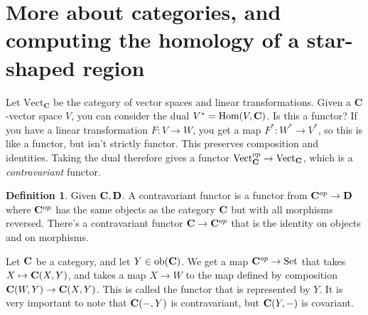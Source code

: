 \documentclass{amsart}
\theoremstyle{theorem}
\theoremstyle{definition}
\newtheorem{definition}[theorem]{Definition}
\DeclareMathOperator{\Hom}{Hom}
\newcommand{\set}{{\mathrm{Set}}}
\begin{document}
\section{More about categories, and computing the homology of a star-shaped region}
Let $\mathrm{Vect}_{\mathbf{C}}$ be the category of vector spaces and linear transformations. Given a $\mathbf{C}$-vector space $V$, you can consider the dual $V^\ast=\Hom(V,\cc)$. Is this a functor? If you have a linear transformation $F:V\to W$, you get a map $F^\ast:W^\ast\to V^\ast$, so this is like a functor, but isn't strictly functor. This preserves composition and identities. Taking the dual therefore gives a functor $\mathrm{Vect}_\mathbf C^{op}\to\mathrm{Vect}_\mathbf C$, which is a \textit{contravariant} functor.
\begin{definition}
Given $\mathbf C,\mathbf D$. A contravariant functor is a functor from $\mathbf C^{op}\to\mathbf D$ where $\mathbf C^{op}$ has the same objects as the category $\mathbf C$ but with all morphisms reversed. There's a contravariant functor $\mathbf C\to\mathbf C^{op}$ that is the identity on objects and on morphisms.
\end{definition}
Let $\mathbf C$ be a category, and let $Y\in\mathrm{ob}(\mathbf C)$. We get a map $\cc^{op}\to\set$ that takes $X\mapsto \mathbf C(X,Y)$, and takes a map $X\to W$ to the map defined by composition $\mathbf C(W,Y)\to \mathbf C(X,Y)$. This is called the functor that is represented by $Y$. It is very important to note that $\mathbf C(-,Y)$ is contravariant, but $\mathbf C(Y,-)$ is covariant.
\end{document}
